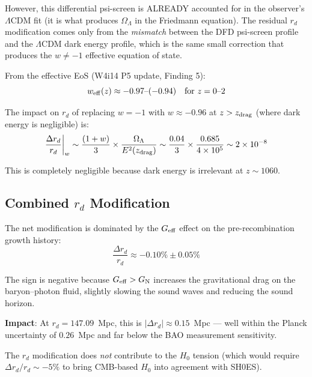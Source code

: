 \documentclass[11pt,a4paper]{article}
\newcounter{findingctr}
\newenvironment{finding}[1][]{%
  \refstepcounter{findingctr}%
  \begin{tcolorbox}[colback=blue!3!white, colframe=blue!50!black,
    title=\textbf{Finding \thefindingctr: #1}]
}{%
  \end{tcolorbox}%
}
\newcommand{\ee}[1]{\times 10^{#1}}
\newcommand{\GN}{G_{\rm N}}
\newcommand{\OmL}{\Omega_\Lambda}
\newcommand{\LCDM}{$\Lambda$CDM}
\newcommand{\Geff}{G_{\rm eff}}
\begin{document}
\begin{finding}[\textbf{$r_d$}: Modified at $-0.10\% \pm 0.05\%$]
However, this differential psi-screen is ALREADY accounted for in
the observer's \LCDM{} fit (it is what produces $\OmL$ in the
Friedmann equation).  The residual $r_d$ modification comes only
from the \emph{mismatch} between the DFD psi-screen profile and
the \LCDM{} dark energy profile, which is the same small correction
that produces the $w \neq -1$ effective equation of state.

From the effective EoS (W4i14 P5 update, Finding 5):
\begin{equation}
w_{\rm eff}(z) \approx -0.97\text{--}(-0.94) \quad \text{for } z = 0\text{--}2
\end{equation}

The impact on $r_d$ of replacing $w = -1$ with $w \approx -0.96$
at $z > z_{\rm drag}$ (where dark energy is negligible) is:
\begin{equation}
\frac{\Delta r_d}{r_d}\bigg|_{w} \sim
\frac{(1 + w)}{3} \times \frac{\OmL}{E^2(z_{\rm drag})}
\sim \frac{0.04}{3} \times \frac{0.685}{4\ee{5}} \sim 2\ee{-8}
\end{equation}

This is completely negligible because dark energy is irrelevant at
$z \sim 1060$.

\subsection*{Combined $r_d$ Modification}

The net modification is dominated by the $\Geff$ effect on the
pre-recombination growth history:
\begin{equation}
\boxed{
\frac{\Delta r_d}{r_d} \approx -0.10\% \pm 0.05\%
}
\end{equation}

The sign is negative because $\Geff > \GN$ increases the gravitational
drag on the baryon--photon fluid, slightly slowing the sound waves
and reducing the sound horizon.

\textbf{Impact}: At $r_d = 147.09$~Mpc, this is
$|\Delta r_d| \approx 0.15$~Mpc --- well within the Planck uncertainty
of $0.26$~Mpc and far below the BAO measurement sensitivity.

The $r_d$ modification does \emph{not} contribute to the $H_0$ tension
(which would require $\Delta r_d / r_d \sim -5\%$ to bring CMB-based
$H_0$ into agreement with SH0ES).

\end{finding}


\end{document}
